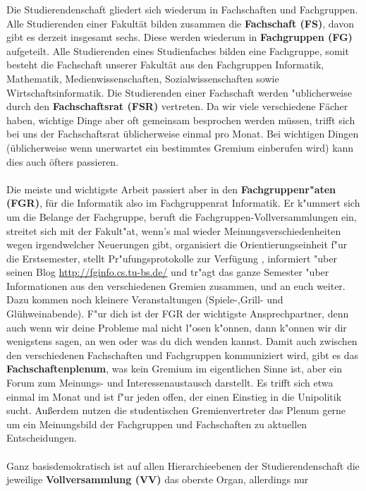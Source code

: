 Die Studierendenschaft gliedert sich wiederum in Fachschaften und Fachgruppen.
Alle Studierenden einer Fakultät bilden zusammen die \textbf{Fachschaft (FS)}, davon gibt es derzeit insgesamt sechs.
Diese werden wiederum in  \textbf{Fachgruppen (FG)} aufgeteilt. Alle Studierenden eines Studienfaches bilden eine Fachgruppe, 
somit besteht die Fachschaft unserer Fakultät aus den Fachgruppen Informatik, Mathematik, Medienwissenschaften, Sozialwissenschaften sowie 
Wirtschaftsinformatik. Die Studierenden einer Fachschaft werden "ublicherweise durch den 
\textbf{Fachschaftsrat (FSR)} vertreten. Da wir viele verschiedene Fächer haben, wichtige Dinge aber oft gemeinsam besprochen werden müssen,
trifft sich bei uns der Fachschaftsrat üblicherweise einmal pro Monat. 
Bei wichtigen Dingen (üblicherweise wenn unerwartet ein bestimmtes Gremium einberufen wird) kann dies auch öfters passieren.
\\\\
Die meiste und wichtigste Arbeit passiert aber in den \textbf{Fachgruppenr"aten (FGR)}, 
für die Informatik also im Fachgruppenrat Informatik. Er k"ummert sich um die Belange der
Fachgruppe, beruft die Fachgruppen-Vollversammlungen ein, streitet sich mit der
Fakult"at, wenn's mal wieder Meinungsverschiedenheiten wegen irgendwelcher 
Neuerungen gibt, organisiert die Orientierungseinheit f"ur die Erstsemester, stellt Pr"ufungsprotokolle 
zur Verfügung , informiert 
"uber seinen Blog \url{http://fginfo.cs.tu-bs.de/}
 und tr"agt das ganze Semester "uber 
Informationen aus den verschiedenen Gremien zusammen, und an euch weiter.
Dazu kommen noch kleinere Veranstaltungen (Spiele-,Grill- und Glühweinabende).
F"ur dich ist der FGR der wichtigste Ansprechpartner, denn auch wenn wir deine Probleme mal nicht l"osen 
k"onnen, dann k"onnen wir dir wenigstens sagen, an wen oder was du dich wenden 
kannst. Damit auch zwischen den verschiedenen Fachschaften
und Fachgruppen kommuniziert wird, 
gibt es das \textbf{Fachschaftenplenum}, was kein Gremium im eigentlichen Sinne 
ist, aber ein Forum zum Meinungs- und Interessenaustausch darstellt. Es trifft 
sich etwa einmal im Monat und ist f"ur jeden offen, der einen Einstieg in die 
Unipolitik sucht. Außerdem nutzen die studentischen Gremienvertreter das Plenum gerne 
um ein Meinungsbild der Fachgruppen und Fachschaften zu aktuellen Entscheidungen.
\\\\
Ganz basisdemokratisch ist auf allen Hierarchie\-ebenen der Studierendenschaft
die jeweilige \textbf{Vollversammlung (VV)} das oberste Organ, allerdings nur
